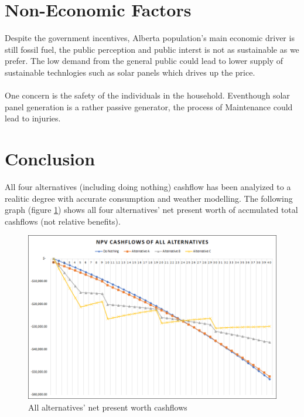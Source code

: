 \documentclass[10pt,letterpaper]{article}
\begin{document}
\section{Non-Economic Factors}

Despite the government incentives, Alberta population's main economic driver is still fossil fuel, the public perception and public interst is not as sustainable as we prefer. The low demand from the general public could lead to lower supply of sustainable technlogies such as solar panels which drives up the price.\\
\\
One concern is the safety of the individuals in the household. Eventhough solar panel generation is a rather passive generator, the process of Maintenance could lead to injuries.\\

\section{Conclusion}\label{section:conclusion}

All four alternatives (including doing nothing) cashflow has been analyized to a realitic degree with accurate consumption and weather modelling. The following graph (figure \ref{fig:combined}) shows all four alternatives' net present worth of accmulated total cashflows (not relative benefits).\\

\begin{figure}[H]
	\centering
	\includegraphics[width=1.0\textwidth]{assets/1534567025903}
	\caption{All alternatives' net present worth cashflows}
	\label{fig:combined}
\end{figure}
\end{document}
